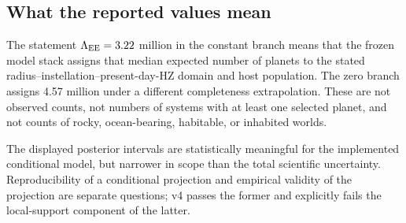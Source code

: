 \subsection{What the reported values mean}

The statement $\Lambda_{\rm EE}=3.22$ million in the constant branch means that the
frozen model stack assigns that median expected number of planets to the stated
radius--instellation--present-day-HZ domain and host population. The zero branch
assigns 4.57 million under a different completeness extrapolation. These are
not observed counts, not numbers of systems with at least one selected planet,
and not counts of rocky, ocean-bearing, habitable, or inhabited worlds.

The displayed posterior intervals are statistically meaningful for the
implemented conditional model, but narrower in scope than the total scientific
uncertainty. Reproducibility of a conditional projection and empirical validity
of the projection are separate questions; v4 passes the former and explicitly
fails the local-support component of the latter.
